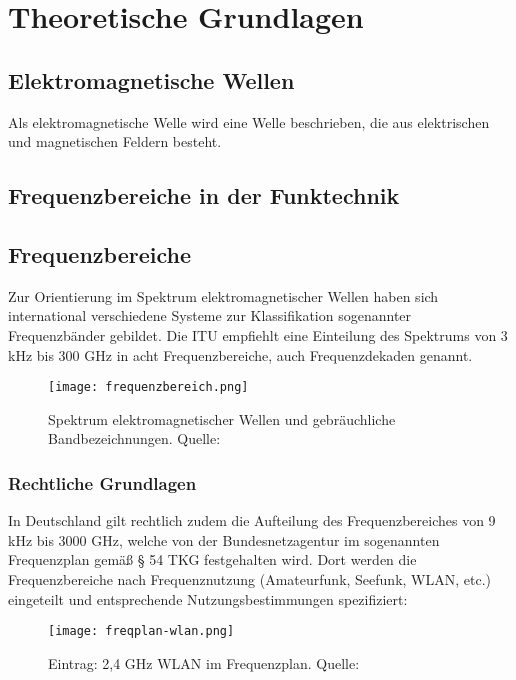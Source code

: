 
\chapter{Theoretische Grundlagen}
\section{Elektromagnetische Wellen}
Als elektromagnetische Welle wird eine Welle beschrieben, die aus elektrischen und magnetischen Feldern besteht. 
\section{Frequenzbereiche in der Funktechnik}
\section{Frequenzbereiche}
Zur Orientierung im Spektrum elektromagnetischer Wellen haben sich international verschiedene Systeme zur Klassifikation sogenannter Frequenzbänder gebildet. Die \ac{ITU} empfiehlt eine Einteilung des Spektrums von 3 kHz bis 300 GHz in acht Frequenzbereiche, auch Frequenzdekaden genannt. \cite[vgl. ITU-R v.431-8]{itu-431:2015}

\begin{figure}[ht]
	\centering
	\texttt{[image: frequenzbereich.png]}
	\caption[Spektrum elektromagnetischer Wellen und gebräuchliche Bandbezeichnungen]{Spektrum elektromagnetischer Wellen und gebräuchliche Bandbezeichnungen. Quelle: \cite[Kark, S. 1]{Kark:2017}} 
	\label{frequenzbereiche}
\end{figure}


\subsection{Rechtliche Grundlagen} %
In Deutschland gilt rechtlich zudem die Aufteilung des Frequenzbereiches von 9 kHz bis 3000 GHz, welche von der Bundesnetzagentur im sogenannten Frequenzplan \cite[Bundesnetzagentur, 2016]{bundesnetzagentur-frequenzplan:2016} gemäß § 54 TKG festgehalten wird.
Dort werden die Frequenzbereiche nach Frequenznutzung (Amateurfunk, Seefunk, WLAN, etc.) eingeteilt und entsprechende Nutzungsbestimmungen spezifiziert:

\begin{figure}[ht]
	\centering
	\texttt{[image: freqplan-wlan.png]}
	\caption[Eintrag: 2,4 GHz WLAN im Frequenzplan]{Eintrag: 2,4 GHz WLAN im Frequenzplan. Quelle: \cite[Bundesnetzagentur, 2016]{bundesnetzagentur-frequenzplan:2016}}
	\label{frequenzplan-wlan}
\end{figure}

